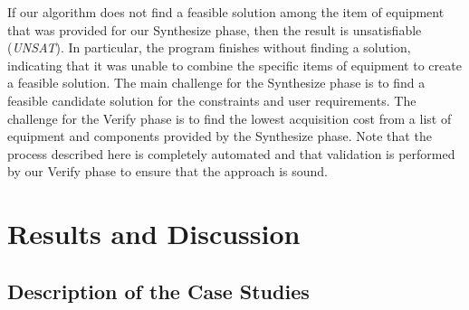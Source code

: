 \documentclass[runningheads]{llncs}
\begin{document}
If our algorithm does not find a feasible solution among the item of equipment that was provided for our {\sc Synthesize} phase, then the result is unsatisfiable (\textit{UNSAT}). In particular, the program finishes without finding a solution, indicating that it was unable to combine the specific items of equipment to create a feasible solution. 
%
The main challenge for the {\sc Synthesize} phase is to find a feasible candidate solution for the constraints and user requirements. The challenge for the {\sc Verify} phase is to find the lowest acquisition cost from a list of equipment and components provided by the {\sc Synthesize} phase. 
%
Note that the process described here is completely automated and that validation is performed by our {\sc Verify} phase to ensure that the approach is sound.

\section{Results and Discussion}
\subsection{Description of the Case Studies}
\end{document}
